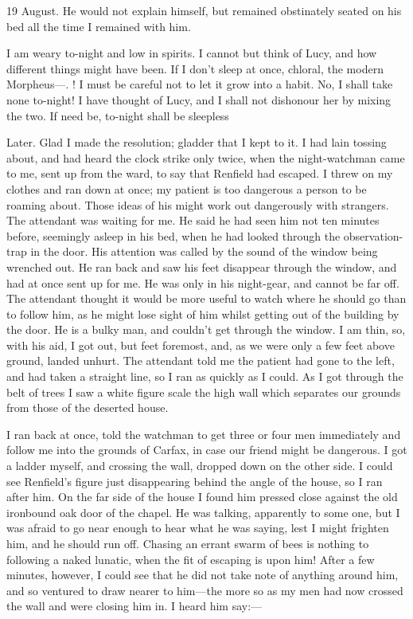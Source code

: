 \begin{diary}{19 August.}
He would not explain himself, but remained obstinately seated on his bed all the time I remained with him.

I am weary to-night and low in spirits. I cannot but think of Lucy, and how different things might have been. If I don't sleep at once, chloral, the modern Morpheus—. ! I must be careful not to let it grow into a habit. No, I shall take none to-night! I have thought of Lucy, and I shall not dishonour her by mixing the two. If need be, to-night shall be sleepless
\end{diary}

 
\begin{diary}{Later.}
Glad I made the resolution; gladder that I kept to it. I had lain tossing about, and had heard the clock strike only twice, when the night-watchman came to me, sent up from the ward, to say that Renfield had escaped. I threw on my clothes and ran down at once; my patient is too dangerous a person to be roaming about. Those ideas of his might work out dangerously with strangers. The attendant was waiting for me. He said he had seen him not ten minutes before, seemingly asleep in his bed, when he had looked through the observation-trap in the door. His attention was called by the sound of the window being wrenched out. He ran back and saw his feet disappear through the window, and had at once sent up for me. He was only in his night-gear, and cannot be far off. The attendant thought it would be more useful to watch where he should go than to follow him, as he might lose sight of him whilst getting out of the building by the door. He is a bulky man, and couldn't get through the window. I am thin, so, with his aid, I got out, but feet foremost, and, as we were only a few feet above ground, landed unhurt. The attendant told me the patient had gone to the left, and had taken a straight line, so I ran as quickly as I could. As I got through the belt of trees I saw a white figure scale the high wall which separates our grounds from those of the deserted house.

I ran back at once, told the watchman to get three or four men immediately and follow me into the grounds of Carfax, in case our friend might be dangerous. I got a ladder myself, and crossing the wall, dropped down on the other side. I could see Renfield's figure just disappearing behind the angle of the house, so I ran after him. On the far side of the house I found him pressed close against the old ironbound oak door of the chapel. He was talking, apparently to some one, but I was afraid to go near enough to hear what he was saying, lest I might frighten him, and he should run off. Chasing an errant swarm of bees is nothing to following a naked lunatic, when the fit of escaping is upon him! After a few minutes, however, I could see that he did not take note of anything around him, and so ventured to draw nearer to him—the more so as my men had now crossed the wall and were closing him in. I heard him say:—


\end{diary}
